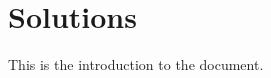 \documentclass{article}
\begin{document}

\section*{Solutions}
This is the introduction to the document.
\end{document}
